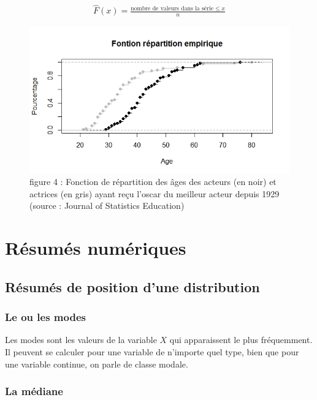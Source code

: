 \documentclass[]{book}
\theoremstyle{definition}
\theoremstyle{definition}
\theoremstyle{remark}
\begin{document}
\begin{align*}
\hat{F}(x)=\frac{ \text{nombre de valeurs dans la série}\leqslant x}{n}
\end{align*}

\begin{figure}[htbp]
\centering
\includegraphics{./figures/figure4.jpg}
\caption{figure 4 : Fonction de répartition des âges des acteurs (en
noir) et actrices (en gris) ayant reçu l'oscar du meilleur acteur depuis
1929 (source : Journal of Statistics Education)}
\end{figure}

\section{Résumés numériques}\label{resumes-numeriques}

\subsection{Résumés de position d'une
distribution}\label{resumes-de-position-dune-distribution}

\subsubsection{Le ou les modes}\label{le-ou-les-modes}

Les modes sont les valeurs de la variable \(X\) qui apparaissent le plus
fréquemment. Il peuvent se calculer pour une variable de n'importe quel
type, bien que pour une variable continue, on parle de classe modale.

\subsubsection{La médiane}\label{la-mediane}
\end{document}

